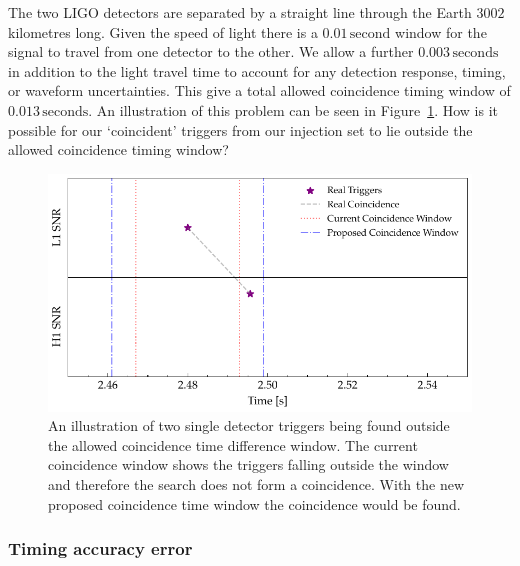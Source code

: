 The two LIGO detectors are separated by a straight line through the Earth $3002$ kilometres long. Given the speed of light there is a $0.01 \, \text{second}$ window for the \gwadj signal to travel from one detector to the other. We allow a further $0.003 \, \text{seconds}$ in addition to the light travel time to account for any detection response, timing, or waveform uncertainties. This give a total allowed coincidence timing window of $0.013 \, \text{seconds}$. An illustration of this problem can be seen in Figure~\ref{6:fig:outside_coinc_window}. How is it possible for our `coincident' triggers from our injection set to lie outside the allowed coincidence timing window?
%
\begin{figure}
    \centering
    \includegraphics[width=\textwidth]{images/6_earlywarning/identified-problems/outside_coinc_window.pdf}
    \caption{An illustration of two single detector triggers being found outside the allowed coincidence time difference window. The current coincidence window shows the triggers falling outside the window and therefore the search does not form a coincidence. With the new proposed coincidence time window the coincidence would be found.}
    \label{6:fig:outside_coinc_window}
\end{figure}
%

\subsubsection{\label{6:sec:timing_error}Timing accuracy error}

